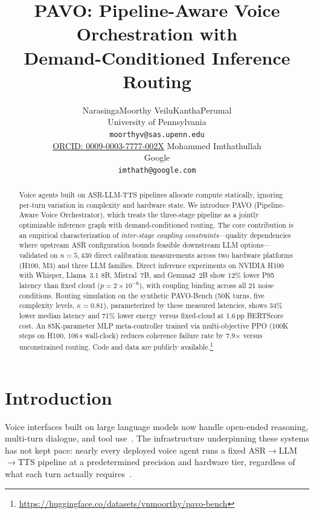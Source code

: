 \documentclass{article}
\title{PAVO: Pipeline-Aware Voice Orchestration with\\Demand-Conditioned Inference Routing}
\author{NarasingaMoorthy VeiluKanthaPerumal \\
University of Pennsylvania \\
\texttt{moorthyv@sas.upenn.edu} \\
\href{https://orcid.org/0009-0003-7777-002X}{ORCID: 0009-0003-7777-002X}
\And
Mohammed Imthathullah \\
Google \\
\texttt{imthath@google.com}}
\begin{document}
\maketitle

\begin{abstract}
Voice agents built on ASR-LLM-TTS pipelines allocate compute statically, ignoring per-turn variation in complexity and hardware state. We introduce PAVO (Pipeline-Aware Voice Orchestrator), which treats the three-stage pipeline as a jointly optimizable inference graph with demand-conditioned routing. The core contribution is an empirical characterization of \emph{inter-stage coupling constraints}---quality dependencies where upstream ASR configuration bounds feasible downstream LLM options---validated on $n=5{,}430$ direct calibration measurements across two hardware platforms (H100, M3) and three LLM families. Direct inference experiments on NVIDIA H100 with Whisper, Llama~3.1 8B, Mistral~7B, and Gemma2~2B show 12\% lower P95 latency than fixed cloud ($p = 2\times10^{-6}$), with coupling binding across all 21 noise conditions. Routing simulation on the synthetic PAVO-Bench (50K turns, five complexity levels, $\kappa=0.81$), parameterized by these measured latencies, shows 34\% lower median latency and 71\% lower energy versus fixed-cloud at 1.6\,pp BERTScore cost. An 85K-parameter MLP meta-controller trained via multi-objective PPO (100K steps on H100, 106\,s wall-clock) reduces coherence failure rate by 7.9$\times$ versus unconstrained routing. Code and data are publicly available.\footnote{\url{https://huggingface.co/datasets/vnmoorthy/pavo-bench}}
\end{abstract}

\section{Introduction}
\label{sec:intro}

Voice interfaces built on large language models now handle open-ended reasoning, multi-turn dialogue, and tool use~\citep{openai2024gpt4o,dubey2024llama3,team2024gemma2}. The infrastructure underpinning these systems has not kept pace: nearly every deployed voice agent runs a fixed ASR$\to$LLM$\to$TTS pipeline at a predetermined precision and hardware tier, regardless of what each turn actually requires~\citep{oord2016wavenet,ren2021fastspeech,kim2021vits,dettmers2022llmint8,frantar2022gptq,lin2024awq}.
\end{document}
